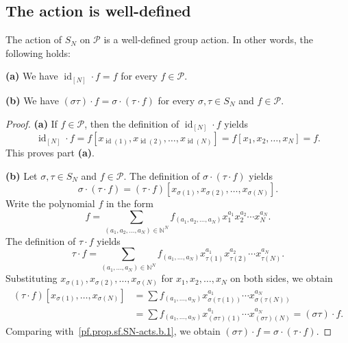 \subsection{The action is well-defined}

\begin{proposition}
\label{prop.sf.SN-acts}
\leantarget
\leanok
The action of $S_N$ on $\mathcal{P}$ is a
well-defined group action. In other words, the following holds: \medskip

\textbf{(a)} We have $\operatorname{id}_{[N]} \cdot f = f$ for every $f \in \mathcal{P}$. \medskip

\textbf{(b)} We have $(\sigma\tau) \cdot f = \sigma \cdot (\tau \cdot f)$
for every $\sigma, \tau \in S_N$ and $f \in \mathcal{P}$.
\end{proposition}

\begin{proof}
\textbf{(a)} If $f \in \mathcal{P}$, then the definition of
$\operatorname{id}_{[N]} \cdot f$ yields
\[
\operatorname{id}_{[N]} \cdot f
= f[x_{\operatorname{id}(1)}, x_{\operatorname{id}(2)}, \ldots, x_{\operatorname{id}(N)}]
= f[x_1, x_2, \ldots, x_N]
= f.
\]
This proves part \textbf{(a)}. \medskip

\textbf{(b)} Let $\sigma, \tau \in S_N$ and $f \in \mathcal{P}$. The definition
of $\sigma \cdot (\tau \cdot f)$ yields
\begin{equation}
\sigma \cdot (\tau \cdot f)
= (\tau \cdot f)[x_{\sigma(1)}, x_{\sigma(2)}, \ldots, x_{\sigma(N)}].
\label{pf.prop.sf.SN-acts.b.1}
\end{equation}
Write the polynomial $f$ in the form
\begin{equation}
f = \sum_{(a_1, a_2, \ldots, a_N) \in \mathbb{N}^N} f_{(a_1, a_2, \ldots, a_N)} x_1^{a_1} x_2^{a_2} \cdots x_N^{a_N}.
\label{pf.prop.sf.SN-acts.b.f=}
\end{equation}
The definition of $\tau \cdot f$ yields
\[
\tau \cdot f = \sum_{(a_1, \ldots, a_N) \in \mathbb{N}^N} f_{(a_1, \ldots, a_N)} x_{\tau(1)}^{a_1} x_{\tau(2)}^{a_2} \cdots x_{\tau(N)}^{a_N}.
\]
Substituting $x_{\sigma(1)}, x_{\sigma(2)}, \ldots, x_{\sigma(N)}$
for $x_1, x_2, \ldots, x_N$ on both sides, we obtain
\begin{align*}
(\tau \cdot f)[x_{\sigma(1)}, \ldots, x_{\sigma(N)}]
&= \sum f_{(a_1, \ldots, a_N)} x_{\sigma(\tau(1))}^{a_1} \cdots x_{\sigma(\tau(N))}^{a_N} \\
&= \sum f_{(a_1, \ldots, a_N)} x_{(\sigma\tau)(1)}^{a_1} \cdots x_{(\sigma\tau)(N)}^{a_N}
= (\sigma\tau) \cdot f.
\end{align*}
Comparing with~\eqref{pf.prop.sf.SN-acts.b.1}, we obtain
$(\sigma\tau) \cdot f = \sigma \cdot (\tau \cdot f)$.
\end{proof}

